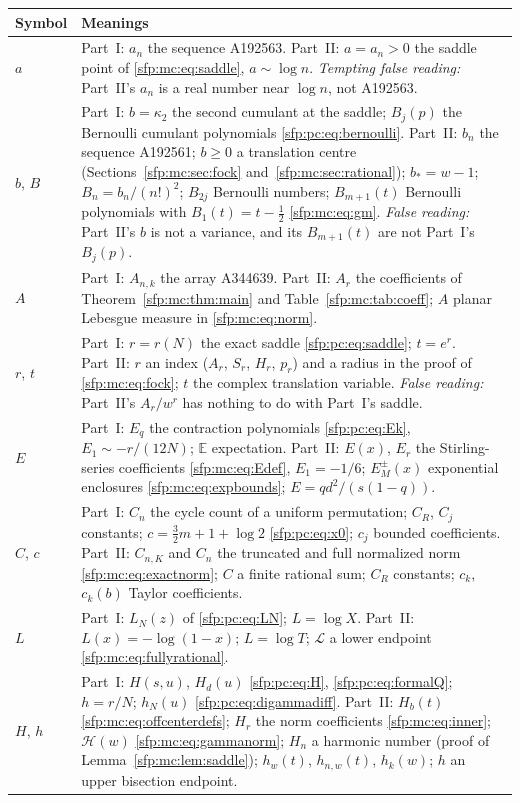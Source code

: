 \documentclass[11pt,letterpaper]{article}
\numberwithin{equation}{section}
\theoremstyle{definition}\newtheorem{definition}[theorem]{Definition}
\theoremstyle{remark}\newtheorem{remark}[theorem]{Remark}
\newcommand{\EE}{\mathbb E}
\begin{document}
\begin{longtable}{@{}>{\raggedright\arraybackslash}p{} >{\raggedright\arraybackslash}p{}@{}}
\toprule
Symbol & Meanings\\
\midrule
\endhead
$a$ & Part~I: $a_n$ the sequence A192563. Part~II: $a=a_n>0$ the saddle point of \eqref{sfp:mc:eq:saddle}, $a\sim\log n$. \emph{Tempting false reading:} Part~II's $a_n$ is a real number near $\log n$, not A192563.\\
$b$, $B$ & Part~I: $b=\kappa_2$ the second cumulant at the saddle; $B_j(p)$ the Bernoulli cumulant polynomials \eqref{sfp:pc:eq:bernoulli}. Part~II: $b_n$ the sequence A192561; $b\ge0$ a translation centre (Sections~\ref{sfp:mc:sec:fock} and~\ref{sfp:mc:sec:rational}); $b_*=w-1$; $B_n=b_n/(n!)^2$; $B_{2j}$ Bernoulli numbers; $B_{m+1}(t)$ Bernoulli polynomials with $B_1(t)=t-\frac12$ \eqref{sfp:mc:eq:gm}. \emph{False reading:} Part~II's $b$ is not a variance, and its $B_{m+1}(t)$ are not Part~I's $B_j(p)$.\\
$A$ & Part~I: $A_{n,k}$ the array A344639. Part~II: $A_r$ the coefficients of Theorem~\ref{sfp:mc:thm:main} and Table~\ref{sfp:mc:tab:coeff}; $A$ planar Lebesgue measure in \eqref{sfp:mc:eq:norm}.\\
$r$, $t$ & Part~I: $r=r(N)$ the exact saddle \eqref{sfp:pc:eq:saddle}; $t=e^r$. Part~II: $r$ an index ($A_r$, $S_r$, $H_r$, $p_r$) and a radius in the proof of \eqref{sfp:mc:eq:fock}; $t$ the complex translation variable. \emph{False reading:} Part~II's $A_r/w^r$ has nothing to do with Part~I's saddle.\\
$E$ & Part~I: $E_q$ the contraction polynomials \eqref{sfp:pc:eq:Ek}, $E_1\sim-r/(12N)$; $\EE$ expectation. Part~II: $E(x)$, $E_r$ the Stirling-series coefficients \eqref{sfp:mc:eq:Edef}, $E_1=-1/6$; $E_M^\pm(x)$ exponential enclosures \eqref{sfp:mc:eq:expbounds}; $E=qd^2/(s(1-q))$.\\
$C$, $c$ & Part~I: $C_n$ the cycle count of a uniform permutation; $C_R$, $C_j$ constants; $c=\frac32m+1+\log2$ \eqref{sfp:pc:eq:x0}; $c_j$ bounded coefficients. Part~II: $C_{n,K}$ and $C_n$ the truncated and full normalized norm \eqref{sfp:mc:eq:exactnorm}; $C$ a finite rational sum; $C_R$ constants; $c_k$, $c_k(b)$ Taylor coefficients.\\
$L$ & Part~I: $L_N(z)$ of \eqref{sfp:pc:eq:LN}; $L=\log X$. Part~II: $L(x)=-\log(1-x)$; $L=\log T$; $\mathcal L$ a lower endpoint \eqref{sfp:mc:eq:fullyrational}.\\
$H$, $h$ & Part~I: $H(s,u)$, $H_d(u)$ \eqref{sfp:pc:eq:H}, \eqref{sfp:pc:eq:formalQ}; $h=r/N$; $h_N(u)$ \eqref{sfp:pc:eq:digammadiff}. Part~II: $H_b(t)$ \eqref{sfp:mc:eq:offcenterdefs}; $H_r$ the norm coefficients \eqref{sfp:mc:eq:inner}; $\mathcal H(w)$ \eqref{sfp:mc:eq:gammanorm}; $H_n$ a harmonic number (proof of Lemma~\ref{sfp:mc:lem:saddle}); $h_w(t)$, $h_{n,w}(t)$, $h_k(w)$; $h$ an upper bisection endpoint.\\

\end{longtable}
\end{document}

